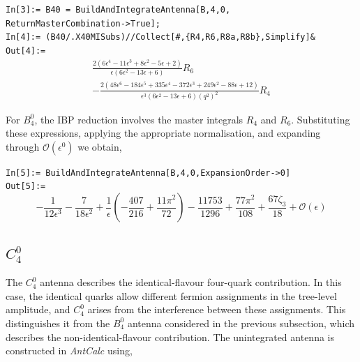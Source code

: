 \begin{mdframed}[backgroundcolor=gray!10, linewidth=0pt]
\texttt{In[3]:= B40 = BuildAndIntegrateAntenna[B,4,0,\\ReturnMasterCombination->True];}\\
\texttt{In[4]:= (B40/.X40MISubs)//Collect[\#,\{R4,R6,R8a,R8b\},Simplify]\&}\\
\hfill
\texttt{Out[4]:=}
    \begin{equation*}
        \begin{gathered}
            \frac{2\left(6\epsilon^4-11\epsilon^3+8\epsilon^2-5\epsilon+2\right)}{\epsilon\left(6\epsilon^2-13\epsilon+6\right)}R_6\\
            -\frac{2\left(48\epsilon^6-184\epsilon^5+335\epsilon^4-372\epsilon^3+249\epsilon^2-88\epsilon+12\right)}{\epsilon^3\left(6\epsilon^2-13\epsilon+6\right)\left(q^2\right)^2}R_4
        \end{gathered}
    \end{equation*}
\end{mdframed}

For $B_4^0$, the IBP reduction involves the master integrals $R_4$ and $R_6$. Substituting
these expressions, applying the appropriate normalisation, and expanding through
$\mathcal O(\epsilon^0)$ we obtain,

\begin{mdframed}[backgroundcolor=gray!10, linewidth=0pt]
\texttt{In[5]:= BuildAndIntegrateAntenna[B,4,0,ExpansionOrder->0]}\\
\hfill
\texttt{Out[5]:=}
    \begin{equation*}
        -\frac1{12\epsilon^3}-\frac7{18\epsilon^2}+\frac{1}{\epsilon}\!\left(-\frac{407}{216}+\frac{11\pi^2}{72}\right)-\frac{11753}{1296}+\frac{77\pi^2}{108}+\frac{67\zeta_3}{18}+\mathcal O(\epsilon)
    \end{equation*}
\end{mdframed}

\subsection{$C_4^0$}\label{subsec:C40}

The $C_4^0$ antenna describes the identical-flavour four-quark contribution. In this case, the
identical quarks allow different fermion assignments in the tree-level amplitude, and $C_4^0$
arises from the interference between these assignments. This distinguishes it from the $B_4^0$
antenna considered in the previous subsection, which describes the non-identical-flavour
contribution. The unintegrated antenna is constructed in \textit{AntCalc} using,

